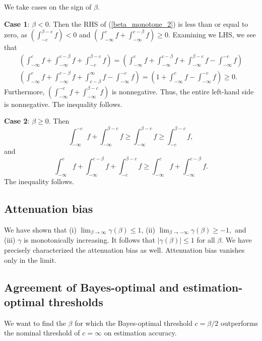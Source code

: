 \documentclass[12pt]{article}
\begin{document}
We take cases on the sign of $\beta$.

\textbf{Case 1}: $\beta < 0$. Then the RHS of (\ref{beta_monotone_2}) is less than or equal to zero, as $\left(\int_{-c}^{\beta-c} f\right) < 0$ and $\left( \int_{-\infty}^c f + \int_{-\infty}^{c-\beta}f \right) \geq 0$. Examining we LHS, we see that
\begin{multline*}
 \left( \int_{-\infty}^c f + \int_{-\infty}^{c -\beta} f + \int_{-c}^{\beta-c} f \right) = \left( \int_{-\infty}^c f + \int_{-\infty}^{c - \beta} f + \int_{-\infty}^{\beta - c} f - \int_{-\infty}^{-c} f \right) \\ \left( \int_{-\infty}^c f + \int_{-\infty}^{c - \beta} f + \int_{c - \beta}^{\infty} f - \int_{-\infty}^{-c} f \right) = \left( 1 + \int_{-\infty}^c f - \int_{-\infty}^{-c} f \right) \geq 0.
 \end{multline*}
 Furthermore, $\left( \int_{-\infty}^{-c} f + \int_{-\infty}^{\beta - c} f \right)$ is nonnegative. Thus, the entire left-hand side is nonnegative. The inequality follows.
 
 \textbf{Case 2}: $\beta \geq 0$. Then
 $$ \int_{-\infty}^{-c} f + \int_{-\infty}^{\beta -c } f \geq \int_{-\infty}^{\beta -c } f \geq \int_{-c}^{\beta - c}  f,$$ and $$ \int_{-\infty}^c f + \int_{-\infty}^{c - \beta} f + \int_{-c}^{\beta - c} f \geq \int_{-\infty}^c f + \int_{-\infty}^{c - \beta} f .$$ The inequality follows.

\subsection{Attenuation bias}

We have shown that (i) $\lim_{\beta \to \infty} \gamma(\beta) \leq 1$, (ii) $\lim_{\beta \to -\infty} \gamma(\beta) \geq -1,$ and (iii) $\gamma$ is monotonically increasing. It follows that $|\gamma(\beta)| \leq 1$ for all $\beta$. We have precisely characterized the attenuation bias as well. Attenuation bias vanishes only in the limit.

\subsection{Agreement of Bayes-optimal and estimation-optimal thresholds}

We want to find the $\beta$ for which the Bayes-optimal threshold $c = \beta/2$ outperforms the nominal threshold of $c = \infty$ on estimation accuracy.
\end{document}
